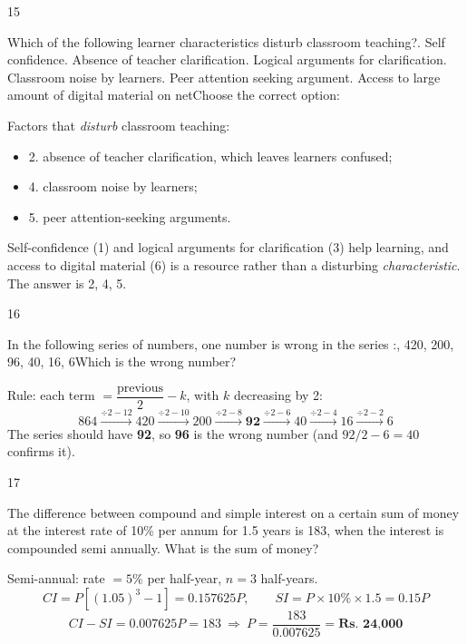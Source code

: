 \begin{question}{15}
{Which of the following learner characteristics disturb classroom teaching?. Self confidence. Absence of teacher clarification. Logical arguments for clarification. Classroom noise by learners. Peer attention seeking argument. Access to large amount of digital material on net\newline Choose the correct option:\par}
\begin{explain}
Factors that \emph{disturb} classroom teaching:
\begin{itemize}
\item 2. absence of teacher clarification, which leaves learners confused;
\item 4. classroom noise by learners;
\item 5. peer attention-seeking arguments.
\end{itemize}
Self-confidence (1) and logical arguments for clarification (3) help learning, and access to digital material (6) is a resource rather than a disturbing \emph{characteristic}. The answer is 2, 4, 5.
\end{explain}
\end{question}

\begin{question}{16}
{In the following series of numbers, one number is wrong in the series :, 420, 200, 96, 40, 16, 6\newline Which is the wrong number?\par}
\begin{explain}
Rule: each term $=\dfrac{\text{previous}}{2}-k$, with $k$ decreasing by 2:
\[864\xrightarrow{\div2-12}420\xrightarrow{\div2-10}200\xrightarrow{\div2-8}\mathbf{92}\xrightarrow{\div2-6}40\xrightarrow{\div2-4}16\xrightarrow{\div2-2}6\]
The series should have \textbf{92}, so \textbf{96} is the wrong number (and $92/2-6=40$ confirms it).
\end{explain}
\end{question}

\begin{question}{17}
{The difference between compound and simple interest on a certain sum of money at the interest rate of 10\% per annum for 1.5 years is 183, when the interest is compounded semi annually. What is the sum of money?\par}
\begin{explain}
Semi-annual: rate $=5\%$ per half-year, $n=3$ half-years.
\[CI=P[(1.05)^3-1]=0.157625P,\qquad SI=P\times10\%\times1.5=0.15P\]
\[CI-SI=0.007625P=183\ \Rightarrow\ P=\frac{183}{0.007625}=\textbf{Rs.\ 24{,}000}\]
\end{explain}
\end{question}


